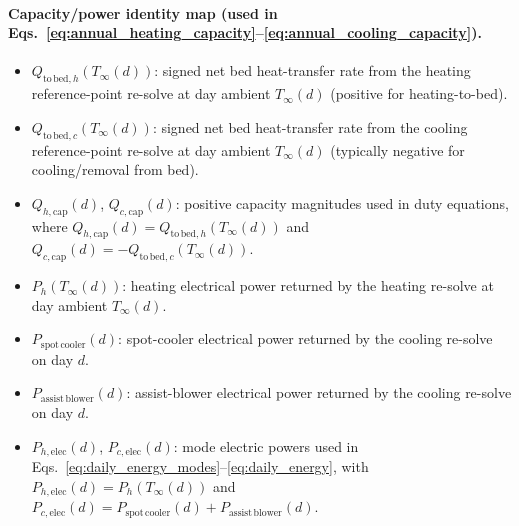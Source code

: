 \documentclass[11pt]{article}
\begin{document}
\paragraph{Capacity/power identity map (used in Eqs.~\eqref{eq:annual_heating_capacity}--\eqref{eq:annual_cooling_capacity}).}
\begin{itemize}[leftmargin=*]
\item \(Q_{\mathrm{to\,bed},h}(T_\infty(d))\): signed net bed heat-transfer rate from the heating reference-point re-solve at day ambient \(T_\infty(d)\) (positive for heating-to-bed).
\item \(Q_{\mathrm{to\,bed},c}(T_\infty(d))\): signed net bed heat-transfer rate from the cooling reference-point re-solve at day ambient \(T_\infty(d)\) (typically negative for cooling/removal from bed).
\item \(Q_{h,\mathrm{cap}}(d)\), \(Q_{c,\mathrm{cap}}(d)\): positive capacity magnitudes used in duty equations, where \(Q_{h,\mathrm{cap}}(d)=Q_{\mathrm{to\,bed},h}(T_\infty(d))\) and \(Q_{c,\mathrm{cap}}(d)=-Q_{\mathrm{to\,bed},c}(T_\infty(d))\).
\item \(P_h(T_\infty(d))\): heating electrical power returned by the heating re-solve at day ambient \(T_\infty(d)\).
\item \(P_{\mathrm{spot\,cooler}}(d)\): spot-cooler electrical power returned by the cooling re-solve on day \(d\).
\item \(P_{\mathrm{assist\,blower}}(d)\): assist-blower electrical power returned by the cooling re-solve on day \(d\).
\item \(P_{h,\mathrm{elec}}(d)\), \(P_{c,\mathrm{elec}}(d)\): mode electric powers used in Eqs.~\eqref{eq:daily_energy_modes}--\eqref{eq:daily_energy}, with \(P_{h,\mathrm{elec}}(d)=P_h(T_\infty(d))\) and \(P_{c,\mathrm{elec}}(d)=P_{\mathrm{spot\,cooler}}(d)+P_{\mathrm{assist\,blower}}(d)\).
\end{itemize}
\end{document}
